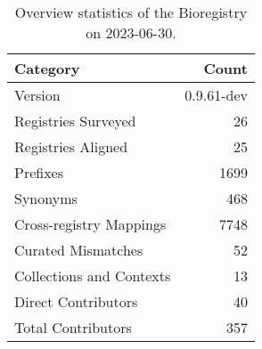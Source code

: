 \begin{table}
\caption{Overview statistics of the Bioregistry on 2023-06-30.}
\label{tab:bioregistry-summary}
\begin{tabular}{lr}
\toprule
Category & Count \\
\midrule
Version & 0.9.61-dev \\
Registries Surveyed & 26 \\
Registries Aligned & 25 \\
Prefixes & 1699 \\
Synonyms & 468 \\
Cross-registry Mappings & 7748 \\
Curated Mismatches & 52 \\
Collections and Contexts & 13 \\
Direct Contributors & 40 \\
Total Contributors & 357 \\
\bottomrule
\end{tabular}
\end{table}
